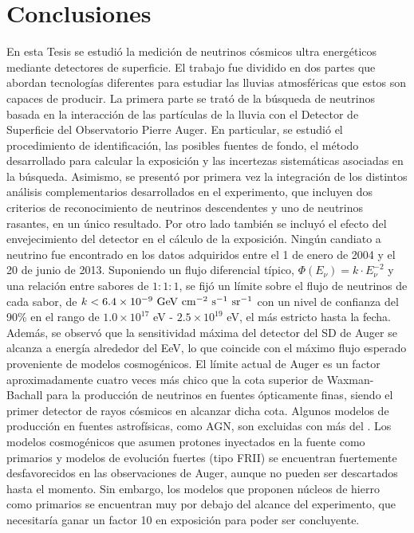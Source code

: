 \chapter{Conclusiones}
\label{ch:concl}

En esta Tesis se estudi\'o la medici\'on de neutrinos c\'osmicos ultra energ\'eticos mediante detectores de superficie. 
El trabajo fue dividido en dos partes que abordan tecnolog\'ias diferentes para estudiar las lluvias atmosf\'ericas que estos son capaces de producir.
La primera parte se trat\'o de la b\'usqueda de neutrinos basada en la interacci\'on de las part\'iculas de la lluvia con el Detector de Superficie del Observatorio Pierre Auger.
En particular, se estudi\'o el procedimiento de identificaci\'on, las posibles fuentes de fondo, el m\'etodo desarrollado para calcular la exposici\'on y las incertezas sistem\'aticas asociadas en la b\'usqueda.
Asimismo, se present\'o por primera vez la integraci\'on de los distintos an\'alisis complementarios desarrollados en el experimento, que incluyen dos criterios de reconocimiento de neutrinos descendentes y uno de neutrinos rasantes, en un \'unico resultado.
Por otro lado tambi\'en se incluy\'o el efecto del envejecimiento del detector en el c\'alculo de la exposici\'on.
Ning\'un candiato a neutrino fue encontrado en los datos adquiridos entre el 1 de enero de 2004 y el 20 de junio de 2013. 
Suponiendo un flujo diferencial t\'ipico, $\Phi(E_\nu)= k\cdot E^{-2}_\nu$ y una relaci\'on entre sabores de $1 : 1 : 1$, se fij\'o un l\'imite sobre el flujo de neutrinos de cada sabor, de $k < 6.4 \times 10^{-9}~{\rm GeV~cm^{-2}~s^{-1}~sr^{-1}}$ con un nivel de confianza del 90\% en el rango de ${1.0 \times 10^{17}}$ {eV} - ${2.5 \times 10^{19}}$ {eV}, el m\'as estricto hasta la fecha.
Adem\'as, se observ\'o que la sensitividad m\'axima del detector del SD de Auger se alcanza a energ\'ia alrededor del EeV, lo que coincide con el m\'aximo flujo esperado proveniente de modelos cosmog\'enicos.
El l\'imite actual de Auger es un factor aproximadamente cuatro veces m\'as chico que la cota superior de Waxman-Bachall para la producci\'on de neutrinos en fuentes \'opticamente finas,
siendo el primer detector de rayos c\'osmicos en alcanzar dicha cota.
Algunos modelos de producci\'on en fuentes astrof\'isicas, como AGN, son excluidas con m\'as del .
Los modelos cosmog\'enicos que asumen protones inyectados en la fuente como primarios y modelos de evoluci\'on fuertes (tipo FRII) se encuentran fuertemente desfavorecidos en las observaciones de Auger, aunque no pueden ser descartados hasta el momento.
Sin embargo, los modelos que proponen n\'ucleos de hierro como primarios se encuentran muy por debajo del alcance del experimento, que necesitar\'ia ganar un factor 10 en exposici\'on para poder ser concluyente.

